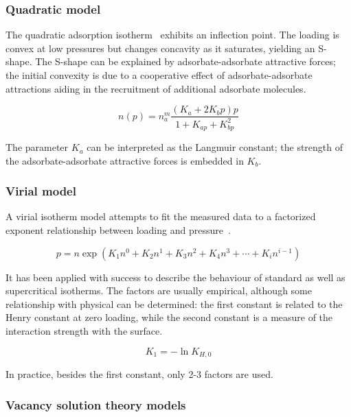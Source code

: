 \subsubsection{Quadratic model}

The quadratic adsorption isotherm~\cite{hillIntroductionStatisticalThermodynamics1986} 
exhibits an inflection point. The loading is convex at low 
pressures but changes concavity as it saturates, yielding
an S-shape. The S-shape can be explained by adsorbate-adsorbate attractive
forces; the initial convexity is due to a cooperative
effect of adsorbate-adsorbate attractions aiding in the recruitment of
additional adsorbate molecules.

\begin{equation}\label{eqn:pyg:quad}
    n(p) = n_a^m \frac{(K_a + 2 K_b p)p}{1+K_{ap} + K_{bp}^2}
\end{equation}

The parameter \(K_a\) can be interpreted as the Langmuir constant; the
strength of the adsorbate-adsorbate attractive forces is embedded in \(K_b\).


\subsubsection{Virial model}

A virial isotherm model attempts to fit the measured data to a factorized
exponent relationship between loading and 
pressure~\cite{myersThermodynamicsAdsorptionPorous2002}.

\begin{equation}\label{eqn:pyg:virial}
    p = n \exp{(K_1n^0 + K_2n^1 + K_3n^2 + K_4n^3 + \cdots + K_i n^{i-1})}
\end{equation}

It has been applied with success to describe the behaviour of standard as
well as supercritical isotherms. The factors are usually empirical,
although some relationship with physical can be determined:
the first constant is related to the Henry constant at zero loading, while
the second constant is a measure of the interaction strength with the surface.

\begin{equation}
    K_1 = -\ln{K_{H,0}}
\end{equation}

In practice, besides the first constant, only 2-3 factors are used.


\subsubsection{Vacancy solution theory models}


